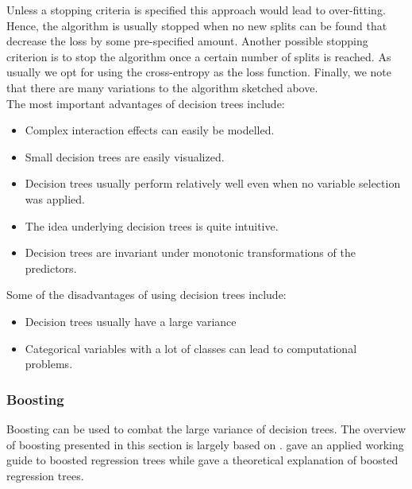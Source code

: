 Unless a stopping criteria is specified this approach would lead to over-fitting. Hence, the algorithm is usually stopped when no new splits can be found that decrease the loss by some pre-specified amount. Another possible stopping criterion is to stop the algorithm once a certain number of splits is reached. As usually we opt for using the cross-entropy as the loss function. Finally, we note that there are many variations to the algorithm sketched above.\\ 

The most important advantages of decision trees include:
\begin{itemize}
\item Complex interaction effects can easily be modelled.
\item Small decision trees are easily visualized.
\item Decision trees usually perform relatively well even when no variable selection was applied.
\item The idea underlying decision trees is quite intuitive.
\item Decision trees are invariant under monotonic transformations of the predictors.
\end{itemize}

Some of the disadvantages of using decision trees include:
\begin{itemize}
\item Decision trees usually have a large variance
\item Categorical variables with a lot of classes can lead to computational problems.
\end{itemize}

\subsubsection{Boosting}
\label{sec:Boosting}
Boosting can be used to combat the large variance of decision trees. The overview of boosting presented in this section is largely based on \cite{elith_working_2008, friedman_additive_2000}. \cite{elith_working_2008} gave an applied working guide to boosted regression trees while \cite{friedman_additive_2000} gave a theoretical explanation of boosted regression trees.\\

